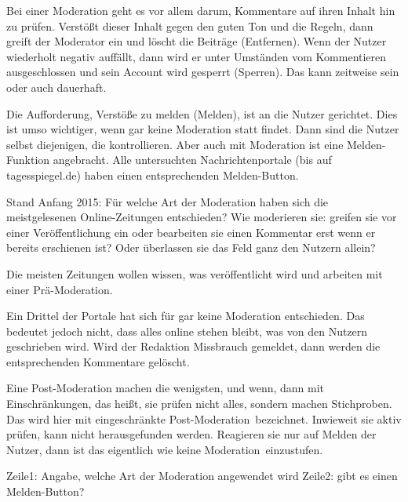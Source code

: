 
Bei einer Moderation geht es vor allem darum, Kommentare auf ihren Inhalt hin zu
prüfen. Verstößt dieser Inhalt gegen den guten Ton und die Regeln, dann greift
der Moderator ein und löscht die Beiträge (Entfernen). Wenn der Nutzer
wiederholt negativ auffällt, dann wird er unter Umständen vom Kommentieren
ausgeschlossen und sein Account wird gesperrt (Sperren). Das kann zeitweise sein
oder auch dauerhaft.

Die Aufforderung, Verstöße zu melden (Melden), ist an die Nutzer gerichtet. Dies
ist umso wichtiger, wenn gar keine Moderation statt findet. Dann sind die Nutzer
selbst diejenigen, die kontrollieren. Aber auch mit Moderation ist eine
Melden-Funktion angebracht. Alle  untersuchten Nachrichtenportale (bis auf
tagesspiegel.de) haben einen entsprechenden Melden-Button.

Stand Anfang 2015: Für welche Art der Moderation haben sich die meistgelesenen
Online-Zeitungen entschieden? Wie moderieren sie: greifen sie vor einer
Veröffentlichung ein oder bearbeiten sie einen Kommentar erst wenn er bereits
erschienen ist? Oder überlassen sie das Feld ganz den Nutzern allein?

Die meisten Zeitungen wollen wissen, was veröffentlicht wird und arbeiten mit
einer Prä-Moderation.

Ein Drittel der Portale hat sich für gar keine Moderation entschieden. Das
bedeutet jedoch nicht, dass alles online stehen bleibt, was von den Nutzern
geschrieben wird. Wird der Redaktion Missbrauch gemeldet, dann werden die
entsprechenden Kommentare gelöscht.

Eine Post-Moderation machen die wenigsten, und wenn, dann mit Einschränkungen,
das heißt, sie prüfen nicht alles, sondern machen Stichproben. Das wird hier mit
\glqq eingeschränkte Post-Moderation\grqq\ bezeichnet. Inwieweit sie aktiv prüfen,
kann nicht herausgefunden werden. Reagieren sie nur auf Melden der Nutzer, dann
ist das eigentlich wie \glqq keine Moderation\grqq\ einzustufen.

Zeile1: Angabe, welche Art der Moderation angewendet wird
Zeile2: gibt es einen Melden-Button?



